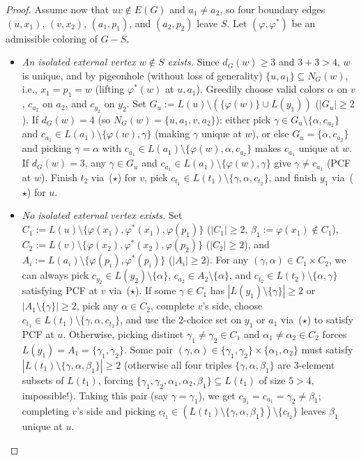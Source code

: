 \documentclass[11pt,a4paper]{article}
\theoremstyle{definition}
\begin{document}
\begin{proof}
Assume now that $uv \notin E(G)$ and $a_1 \neq a_2$, so four boundary edges $(u, x_1)$, $(v, x_2)$, $(a_1, p_1)$, and $(a_2, p_2)$ leave $S$. Let $(\varphi, \varphi^*)$ be an admissible coloring of $G - S$.
\begin{itemize}[leftmargin=*,itemsep=2pt]
  \item \emph{An isolated external vertex $w \notin S$ exists.} Since $d_G(w) \ge 3$ and $3 + 3 > 4$, $w$ is unique, and by pigeonhole (without loss of generality) $\{u, a_1\} \subseteq N_G(w)$, i.e., $x_1 = p_1 = w$ (lifting $\varphi^*(w)$ at $u, a_1$). Greedily choose valid colors $\alpha$ on $v$, $c_{a_2}$ on $a_2$, and $c_{y_2}$ on $y_2$. Set $G_u := L(u) \setminus (\{\varphi(w)\} \cup L(y_1))$ ($|G_u| \ge 2$). If $d_G(w) = 4$ (so $N_G(w) = \{u, a_1, v, a_2\}$): either pick $\gamma \in G_u \setminus \{\alpha, c_{a_2}\}$ and $c_{a_1} \in L(a_1) \setminus \{\varphi(w), \gamma\}$ (making $\gamma$ unique at $w$), or else $G_u = \{\alpha, c_{a_2}\}$ and picking $\gamma = \alpha$ with $c_{a_1} \in L(a_1) \setminus \{\varphi(w), \alpha, c_{a_2}\}$ makes $c_{a_1}$ unique at $w$. If $d_G(w) = 3$, any $\gamma \in G_u$ and $c_{a_1} \in L(a_1) \setminus \{\varphi(w), \gamma\}$ give $\gamma \neq c_{a_1}$ (PCF at $w$). Finish $t_2$ via~($\star$) for $v$, pick $c_{t_1} \in L(t_1) \setminus \{\gamma, \alpha, c_{t_2}\}$, and finish $y_1$ via~($\star$) for $u$.
  \item \emph{No isolated external vertex exists.} Set $C_1 := L(u) \setminus \{\varphi(x_1), \varphi^*(x_1), \varphi(p_1)\}$ ($|C_1| \ge 2$, $\beta_1 := \varphi(x_1) \notin C_1$), $C_2 := L(v) \setminus \{\varphi(x_2), \varphi^*(x_2), \varphi(p_2)\}$ ($|C_2| \ge 2$), and $A_i := L(a_i) \setminus \{\varphi(p_i), \varphi^*(p_i)\}$ ($|A_i| \ge 2$). For any $(\gamma, \alpha) \in C_1 \times C_2$, we can always pick $c_{y_2} \in L(y_2) \setminus \{\alpha\}$, $c_{a_2} \in A_2 \setminus \{\alpha\}$, and $c_{t_2} \in L(t_2) \setminus \{\alpha, \gamma\}$ satisfying PCF at $v$ via~($\star$). If some $\gamma \in C_1$ has $|L(y_1) \setminus \{\gamma\}| \ge 2$ or $|A_1 \setminus \{\gamma\}| \ge 2$, pick any $\alpha \in C_2$, complete $v$'s side, choose $c_{t_1} \in L(t_1) \setminus \{\gamma, \alpha, c_{t_2}\}$, and use the $2$-choice set on $y_1$ or $a_1$ via~($\star$) to satisfy PCF at $u$. Otherwise, picking distinct $\gamma_1 \neq \gamma_2 \in C_1$ and $\alpha_1 \neq \alpha_2 \in C_2$ forces $L(y_1) = A_1 = \{\gamma_1, \gamma_2\}$. Some pair $(\gamma, \alpha) \in \{\gamma_1, \gamma_2\} \times \{\alpha_1, \alpha_2\}$ must satisfy $|L(t_1) \setminus \{\gamma, \alpha, \beta_1\}| \ge 2$ (otherwise all four triples $\{\gamma, \alpha, \beta_1\}$ are $3$-element subsets of $L(t_1)$, forcing $\{\gamma_1, \gamma_2, \alpha_1, \alpha_2, \beta_1\} \subseteq L(t_1)$ of size $5 > 4$, impossible!). Taking this pair (say $\gamma = \gamma_1$), we get $c_{y_1} = c_{a_1} = \gamma_2 \neq \beta_1$; completing $v$'s side and picking $c_{t_1} \in (L(t_1) \setminus \{\gamma, \alpha, \beta_1\}) \setminus \{c_{t_2}\}$ leaves $\beta_1$ unique at $u$. \qedhere
\end{itemize}
\end{proof}
\end{document}
